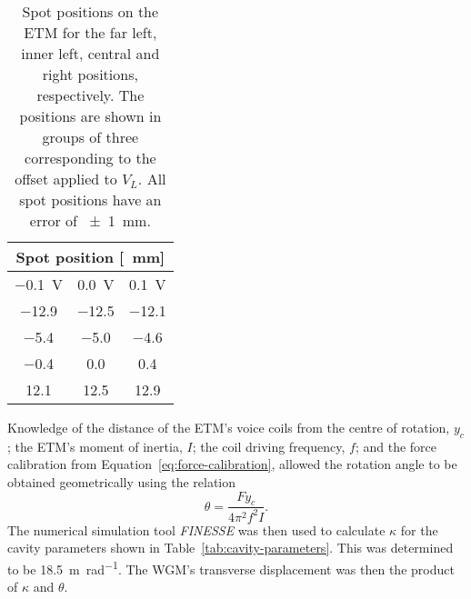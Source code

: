 \begin{table}
  \centering
  \begin{tabular}{|c|c|c|}
    \hline
    \multicolumn{3}{|c|}{\textbf{Spot position [\SI{}{\milli \meter}]}} \\ \hline
    \SI{-0.1}{\volt} & \SI{0.0}{\volt} & \SI{+0.1}{\volt}               \\ \hline\hline
    \num{-12.9} & \num{-12.5} & \num{-12.1}                             \\ \hline
    \num{-5.4} & \num{-5.0} & \num{-4.6}                                \\ \hline
    \num{-0.4} & \num{0.0} & \num{0.4}                                  \\ \hline
    \num{12.1} & \num{12.5} & \num{12.9}                                \\ \hline
  \end{tabular}
  \caption{\label{tab:spot-positions}Spot positions on the \gls{ETM} for the far left, inner left, central and right positions, respectively. The positions are shown in groups of three corresponding to the offset applied to $V_L$. All spot positions have an error of \SI{\pm1}{\milli\meter}.}
\end{table}

Knowledge of the distance of the \gls{ETM}'s voice coils from the centre of rotation, $y_c$; the \gls{ETM}'s moment of inertia, $I$; the coil driving frequency, $f$; and the force calibration from Equation~\ref{eq:force-calibration}, allowed the rotation angle to be obtained geometrically using the relation
\begin{equation}
  \theta = \frac{F y_c}{4 \pi^2 f^2 I}.
  \label{eq:rotation-calibration}
\end{equation}
The numerical simulation tool \emph{FINESSE} \cite{Freise2004} was then used to calculate $\kappa$ for the cavity parameters shown in Table~\ref{tab:cavity-parameters}. This was determined to be \SI{18.5}{\meter \per \radian}. The \gls{WGM}'s transverse displacement was then the product of $\kappa$ and $\theta$.

